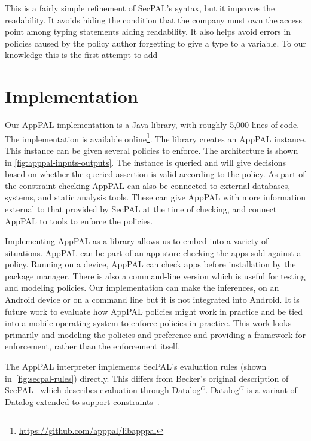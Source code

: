 \documentclass[thesis.tex]{subfiles}
\begin{document}
This is a fairly simple refinement of SecPAL's syntax, but it improves the
readability. It avoids hiding the condition that the company must own the access
point among typing statements aiding readability. It also helps avoid errors
in policies caused by the policy author forgetting to give a type to a variable.
To our knowledge this is the first attempt to add 

\section{Implementation}
\label{sec:implementation}

Our AppPAL implementation is a Java library, with roughly 5,000 lines of code.
The implementation is available
online\footnote{\url{https://github.com/apppal/libapppal}}. The library creates
an AppPAL instance. This instance can be given several policies to enforce. The
architecture is shown in \autoref{fig:apppal-inputs-outputs}. The instance is
queried and will give decisions based on whether the queried assertion is valid
according to the policy. As part of the constraint checking AppPAL can also be
connected to external databases, systems, and static analysis tools. These can
give AppPAL with more information external to that provided by SecPAL at the
time of checking, and connect AppPAL to tools to enforce the policies.

Implementing AppPAL as a library allows us to embed into a variety of
situations. AppPAL can be part of an app store checking the apps sold against a
policy. Running on a device, AppPAL can check apps before installation by the
package manager. There is also a command-line version which is useful for
testing and modeling policies. Our implementation can make the inferences, on
an Android device or on a command line but it is not integrated into Android. It
is future work to evaluate how AppPAL policies might work in practice and be
tied into a mobile operating system to enforce policies in practice. This work
looks primarily and modeling the policies and preference and providing a
framework for enforcement, rather than the enforcement itself.

The AppPAL interpreter implements SecPAL's evaluation rules (shown
in~\autoref{fig:secpal-rules}) directly. This differs from Becker's original
description of SecPAL~\cite{becker_secpal:_2006} which describes evaluation
through Datalog$^C$. Datalog$^C$ is a variant of Datalog extended to support
constraints~\cite{li_datalog_2003}. 
\end{document}
